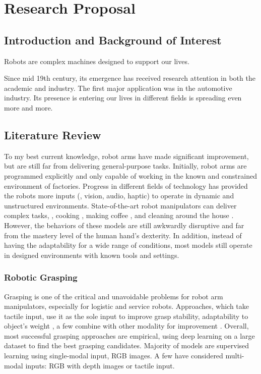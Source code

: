 \chapter{Research Proposal}

\section{Introduction and Background of Interest}


Robots are complex machines designed to support our lives.

Since mid 19th century, its emergence has received research attention in both the academic and industry. The first major application was in the automotive industry. Its presence is entering our lives in different fields is spreading even more and more. 

\section{Literature Review}

To my best current knowledge, robot arms have made significant improvement, but are still far from delivering general-purpose tasks. Initially, robot arms are programmed explicitly and only capable of working in the known and constrained environment of factories. Progress in different fields of technology has provided the robots more inputs (\eg, vision, audio, haptic) to operate in dynamic and unstructured environments. State-of-the-art robot manipulators can deliver complex tasks, \eg, cooking \cite{moley}, making coffee \cite{coffeemaster}, and cleaning around the house \cite{bothandy}. However, the behaviors of these models are still awkwardly disruptive and far from the mastery level of the human hand's dexterity. In addition, instead of having the adaptability for a wide range of conditions, most models still operate in designed environments with known tools and settings.

\subsection{Robotic Grasping}

Grasping is one of the critical and unavoidable problems for robot arm manipulators, especially for logistic and service robots. Approaches, which take tactile input, use it as the sole input to improve grasp stability, adaptability to object's weight \cite{bekiroglu2011assessing, li2014learning}, a few combine with other modality for improvement \cite{calandra2017feeling}. Overall, most successful grasping approaches are empirical, using deep learning on a large dataset to find the best grasping candidates. Majority of models are supervised learning using single-modal input, \ie RGB images. A few have considered multi-modal inputs: RGB with depth images or tactile input. \cite{bohg2013data, caldera2018review, li2019review, kleeberger2020survey}

